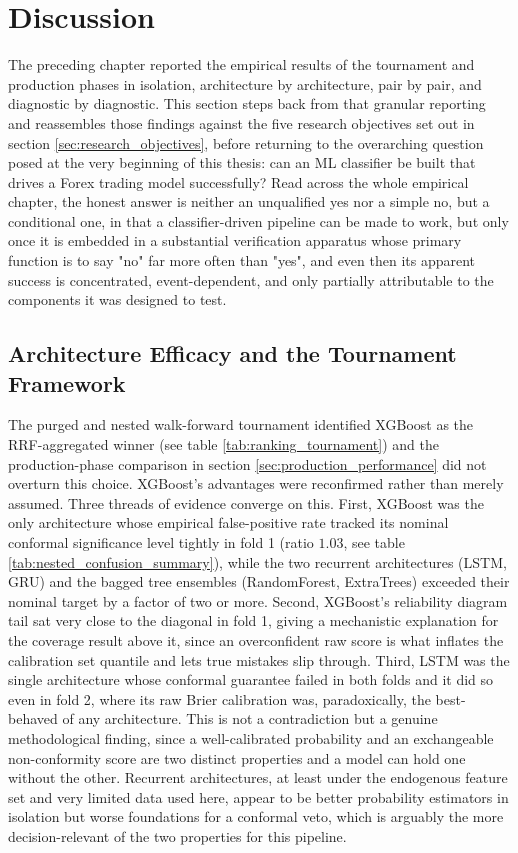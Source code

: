\documentclass[12pt, a4paper]{article}
\begin{document}
\section{Discussion}

The preceding chapter reported the empirical results of the tournament and production phases in isolation, architecture by architecture, pair by pair, and diagnostic by diagnostic. 
This section steps back from that granular reporting and reassembles those findings against the five research objectives set out in section \ref{sec:research_objectives}, before 
returning to the overarching question posed at the very beginning of this thesis: can an ML classifier be built that drives a Forex trading model successfully? Read across the whole 
empirical chapter, the honest answer is neither an unqualified yes nor a simple no, but a conditional one, in that a classifier-driven pipeline can be made to work, but only once 
it is embedded in a substantial verification apparatus whose primary function is to say "no" far more often than "yes", and even then its apparent success is concentrated, 
event-dependent, and only partially attributable to the components it was designed to test.


\subsection{Architecture Efficacy and the Tournament Framework}

The purged and nested walk-forward tournament identified XGBoost as the RRF-aggregated winner (see table \ref{tab:ranking_tournament}) and the production-phase comparison 
in section \ref{sec:production_performance} did not overturn this choice. XGBoost's advantages were reconfirmed rather than merely assumed. Three 
threads of evidence converge on this. First, XGBoost was the only architecture whose empirical false-positive rate tracked its nominal conformal significance level tightly in fold 1 
(ratio $1.03$, see table \ref{tab:nested_confusion_summary}), while the two recurrent architectures (LSTM, GRU) and the bagged tree ensembles (RandomForest, ExtraTrees) exceeded their 
nominal target by a factor of two or more. Second, XGBoost's reliability diagram tail sat very close to the diagonal in fold 1, giving a mechanistic explanation for the coverage result 
above it, since an overconfident raw score is what inflates the calibration set quantile and lets true mistakes slip through. Third, LSTM was the single architecture whose 
conformal guarantee failed in both folds and it did so even in fold 2, where its raw Brier calibration was, paradoxically, the best-behaved of any architecture. This is not a 
contradiction but a genuine methodological finding, since a well-calibrated probability and an exchangeable non-conformity score are two distinct properties and a model can hold 
one without the other. Recurrent architectures, at least under the endogenous feature set and very limited data used here, appear to be better probability estimators in isolation but 
worse foundations for a conformal veto, which is arguably the more decision-relevant of the two properties for this pipeline.
\end{document}
